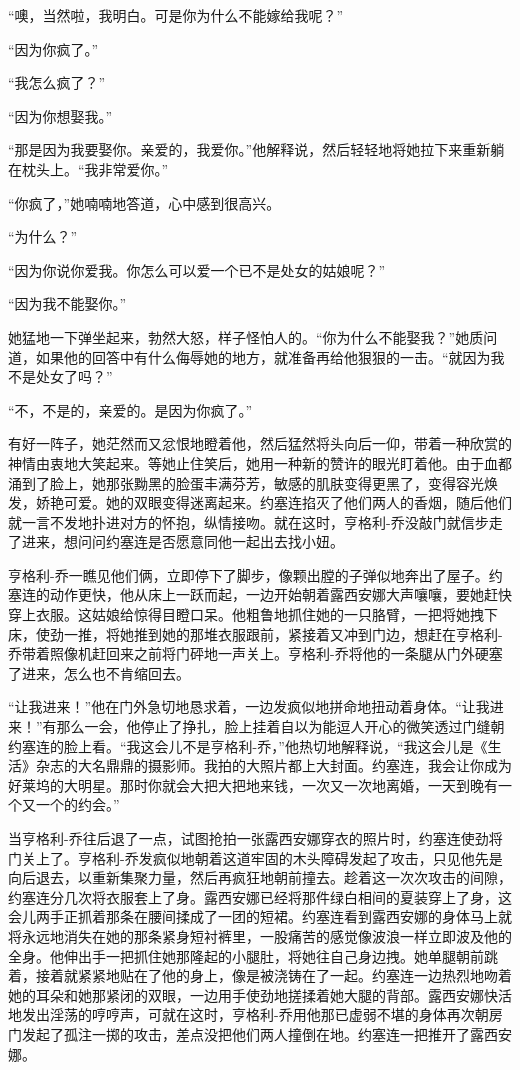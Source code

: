     “噢，当然啦，我明白。可是你为什么不能嫁给我呢？”

    “因为你疯了。”

    “我怎么疯了？”

    “因为你想娶我。”

    “那是因为我要娶你。亲爱的，我爱你。”他解释说，然后轻轻地将她拉下来重新躺在枕头上。“我非常爱你。”

    “你疯了，”她喃喃地答道，心中感到很高兴。

    “为什么？”

    “因为你说你爱我。你怎么可以爱一个已不是处女的姑娘呢？”

    “因为我不能娶你。”

    她猛地一下弹坐起来，勃然大怒，样子怪怕人的。“你为什么不能娶我？”她质问道，如果他的回答中有什么侮辱她的地方，就准备再给他狠狠的一击。“就因为我不是处女了吗？”

    “不，不是的，亲爱的。是因为你疯了。”

    有好一阵子，她茫然而又忿恨地瞪着他，然后猛然将头向后一仰，带着一种欣赏的神情由衷地大笑起来。等她止住笑后，她用一种新的赞许的眼光盯着他。由于血都涌到了脸上，她那张黝黑的脸蛋丰满芬芳，敏感的肌肤变得更黑了，变得容光焕发，娇艳可爱。她的双眼变得迷离起来。约塞连掐灭了他们两人的香烟，随后他们就一言不发地扑进对方的怀抱，纵情接吻。就在这时，亨格利-乔没敲门就信步走了进来，想问问约塞连是否愿意同他一起出去找小妞。

    亨格利-乔一瞧见他们俩，立即停下了脚步，像颗出膛的子弹似地奔出了屋子。约塞连的动作更快，他从床上一跃而起，一边开始朝着露西安娜大声嚷嚷，要她赶快穿上衣服。这姑娘给惊得目瞪口呆。他粗鲁地抓住她的一只胳臂，一把将她拽下床，使劲一推，将她推到她的那堆衣服跟前，紧接着又冲到门边，想赶在亨格利-乔带着照像机赶回来之前将门砰地一声关上。亨格利-乔将他的一条腿从门外硬塞了进来，怎么也不肯缩回去。
 


    “让我进来！”他在门外急切地恳求着，一边发疯似地拼命地扭动着身体。“让我进来！”有那么一会，他停止了挣扎，脸上挂着自以为能逗人开心的微笑透过门缝朝约塞连的脸上看。“我这会儿不是亨格利-乔，”他热切地解释说，“我这会儿是《生活》杂志的大名鼎鼎的摄影师。我拍的大照片都上大封面。约塞连，我会让你成为好莱坞的大明星。那时你就会大把大把地来钱，一次又一次地离婚，一天到晚有一个又一个的约会。”

    当亨格利-乔往后退了一点，试图抢拍一张露西安娜穿衣的照片时，约塞连使劲将门关上了。亨格利-乔发疯似地朝着这道牢固的木头障碍发起了攻击，只见他先是向后退去，以重新集聚力量，然后再疯狂地朝前撞去。趁着这一次次攻击的间隙，约塞连分几次将衣服套上了身。露西安娜已经将那件绿白相间的夏装穿上了身，这会儿两手正抓着那条在腰间揉成了一团的短裙。约塞连看到露西安娜的身体马上就将永远地消失在她的那条紧身短衬裤里，一股痛苦的感觉像波浪一样立即波及他的全身。他伸出手一把抓住她那隆起的小腿肚，将她往自己身边拽。她单腿朝前跳着，接着就紧紧地贴在了他的身上，像是被浇铸在了一起。约塞连一边热烈地吻着她的耳朵和她那紧闭的双眼，一边用手使劲地搓揉着她大腿的背部。露西安娜快活地发出淫荡的哼哼声，可就在这时，亨格利-乔用他那已虚弱不堪的身体再次朝房门发起了孤注一掷的攻击，差点没把他们两人撞倒在地。约塞连一把推开了露西安娜。

